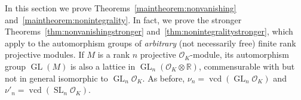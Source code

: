 \documentclass[11 pt]{article}
\theoremstyle{plain}
\theoremstyle{definition}
\numberwithin{equation}{section}
\DeclareMathOperator{\GL}{GL}
\DeclareMathOperator{\SL}{SL}
\newcommand\R{\ensuremath{\mathbb{R}}}
\newcommand\Z{\ensuremath{\mathbb{Z}}}
\newcommand\Q{\ensuremath{\mathbb{Q}}}
\renewcommand{\O}{\mathcal{O}}
\DeclareMathOperator{\vcd}{vcd}
\newcommand\tensor{\otimes}
\newcommand\iso{\cong}
\newcommand\GLvcd{\nu_n}
\newcommand\SLvcd{\nu'_n}
\begin{document}
In this section we prove Theorems~\ref{maintheorem:nonvanishing} and~\ref{maintheorem:nonintegrality}. In fact, we prove the stronger Theorems~\ref{thm:nonvanishingstronger} and~\ref{thm:nonintegralitystronger}, which apply to the automorphism groups of \emph{arbitrary} (not necessarily free) finite rank projective modules.  If $M$ is a rank $n$ projective $\O_K$-module, its automorphism group $\GL(M)$ is also a lattice in $\GL_n(\O_K\tensor \R)$, commensurable with 
but not in general isomorphic to $\GL_n\O_K$.
As before, $\GLvcd = \vcd(\GL_n \O_K)$ and $\SLvcd = \vcd(\SL_n\O_K)$. 





\end{document}
